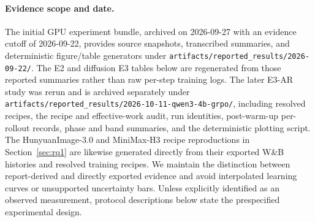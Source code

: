 \documentclass[10pt]{article}
\newcommand{\codepath}[1]{\texttt{#1}}
\begin{document}
\paragraph{Evidence scope and date.}
The initial GPU experiment bundle, archived on 2026-09-27 with an evidence cutoff of 2026-09-22, provides source snapshots, transcribed summaries, and deterministic figure/table generators under \codepath{artifacts/reported\_results/2026-09-22/}.
The E2 and diffusion E3 tables below are regenerated from those reported summaries rather than raw per-step training logs.
The later E3-AR study was rerun and is archived separately under \codepath{artifacts/reported\_results/2026-10-11-qwen3-4b-grpo/}, including resolved recipes, the recipe and effective-work audit, run identities, post-warm-up per-rollout records, phase and band summaries, and the deterministic plotting script.
The HunyuanImage-3.0 and MiniMax-H3 recipe reproductions in Section~\ref{sec:rq1} are likewise generated directly from their exported W\&B histories and resolved training recipes.
We maintain the distinction between report-derived and directly exported evidence and avoid interpolated learning curves or unsupported uncertainty bars.
Unless explicitly identified as an observed measurement, protocol descriptions below state the prespecified experimental design.
\end{document}
